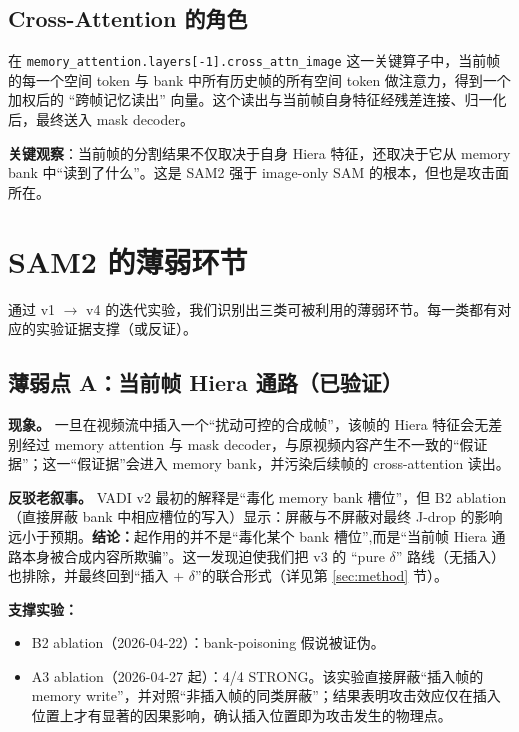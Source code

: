 \documentclass[11pt,a4paper]{ctexart}
\begin{document}
\subsection{Cross-Attention 的角色}

在 \texttt{memory\_attention.layers[-1].cross\_attn\_image} 这一关键算子中，当前帧的每一个空间 token 与 bank 中所有历史帧的所有空间 token 做注意力，得到一个加权后的 ``跨帧记忆读出'' 向量。这个读出与当前帧自身特征经残差连接、归一化后，最终送入 mask decoder。

\textbf{关键观察}：当前帧的分割结果不仅取决于自身 Hiera 特征，还取决于它从 memory bank 中``读到了什么''。这是 SAM2 强于 image-only SAM 的根本，但也是攻击面所在。

\section{SAM2 的薄弱环节}
\label{sec:weakness}

通过 v1 \(\to\) v4 的迭代实验，我们识别出三类可被利用的薄弱环节。每一类都有对应的实验证据支撑（或反证）。

\subsection{薄弱点 A：当前帧 Hiera 通路（已验证）}

\textbf{现象。} 一旦在视频流中插入一个``扰动可控的合成帧''，该帧的 Hiera 特征会无差别经过 memory attention 与 mask decoder，与原视频内容产生不一致的``假证据''；这一``假证据''会进入 memory bank，并污染后续帧的 cross-attention 读出。

\textbf{反驳老叙事。} VADI v2 最初的解释是``毒化 memory bank 槽位''，但 B2 ablation（直接屏蔽 bank 中相应槽位的写入）显示：屏蔽与不屏蔽对最终 J-drop 的影响远小于预期。\textbf{结论：}起作用的并不是``毒化某个 bank 槽位'',而是``当前帧 Hiera 通路本身被合成内容所欺骗''。这一发现迫使我们把 v3 的 ``pure $\delta$'' 路线（无插入）也排除，并最终回到``插入 + $\delta$''的联合形式（详见第 \ref{sec:method} 节）。

\textbf{支撑实验：}
\begin{itemize}[leftmargin=2em]
    \item B2 ablation（2026-04-22）：bank-poisoning 假说被证伪。
    \item A3 ablation（2026-04-27 起）：4/4 STRONG。该实验直接屏蔽``插入帧的 memory write''，并对照``非插入帧的同类屏蔽''；结果表明攻击效应仅在插入位置上才有显著的因果影响，确认插入位置即为攻击发生的物理点。
\end{itemize}
\end{document}
